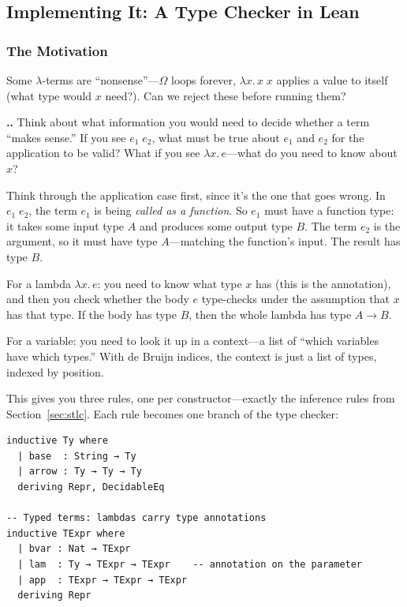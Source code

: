 \documentclass[11pt,a4paper]{article}
\newcounter{exercise}[section]
\renewcommand{\theexercise}{\thesection.\arabic{exercise}}
\theoremstyle{definition}
\newcommand{\lam}{\lambda}
\begin{document}


\subsection{Implementing It: A Type Checker in Lean}\label{sec:typechecker}

\subsubsection{The Motivation}

Some $\lam$-terms are ``nonsense''---$\Omega$ loops forever, $\lam x.\, x\;x$
applies a value to itself (what type would $x$ need?). Can we reject these
before running them?

\begin{exercisebox}
\textbf{\theexercise.}\; Think about what information you would need to decide whether a term ``makes sense.'' If you see $e_1\;e_2$, what must be true about $e_1$ and $e_2$ for the application to be valid? What if you see $\lam x.\, e$---what do you need to know about $x$?
\end{exercisebox}

Think through the application case first, since it's the one that goes wrong.
In $e_1\;e_2$, the term $e_1$ is being \emph{called as a function}. So $e_1$
must have a function type: it takes some input type $A$ and produces some output
type $B$. The term $e_2$ is the argument, so it must have type $A$---matching
the function's input. The result has type $B$.

For a lambda $\lam x.\, e$: you need to know what type $x$ has (this is the
annotation), and then you check whether the body $e$ type-checks under the
assumption that $x$ has that type. If the body has type $B$, then the whole
lambda has type $A \to B$.

For a variable: you need to look it up in a context---a list of ``which
variables have which types.'' With de Bruijn indices, the context is just a
list of types, indexed by position.

This gives you three rules, one per constructor---exactly the inference rules
from Section~\ref{sec:stlc}. Each rule becomes one branch of the type checker:

\begin{verbatim}
inductive Ty where
  | base  : String → Ty
  | arrow : Ty → Ty → Ty
  deriving Repr, DecidableEq

-- Typed terms: lambdas carry type annotations
inductive TExpr where
  | bvar : Nat → TExpr
  | lam  : Ty → TExpr → TExpr    -- annotation on the parameter
  | app  : TExpr → TExpr → TExpr
  deriving Repr
\end{verbatim}
\end{document}
